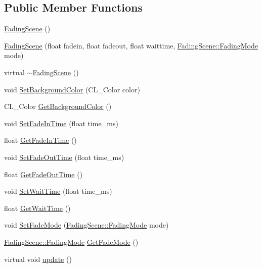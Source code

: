 \subsection*{Public Member Functions}
\begin{DoxyCompactItemize}
\item 
\hyperlink{class_fading_scene_ac2e17e101c77a8c3dace9bbea8d54f27}{FadingScene} ()
\item 
\hyperlink{class_fading_scene_a9ac1472cbd35acb25bce080e6279ca87}{FadingScene} (float fadein, float fadeout, float waittime, \hyperlink{class_fading_scene_aac44cee699d9da962cfd083422808805}{FadingScene::FadingMode} mode)
\item 
virtual \hyperlink{class_fading_scene_aad75b17457eccb13910230f77ff3cc71}{$\sim$FadingScene} ()
\item 
void \hyperlink{class_fading_scene_a9fc4f665d09a7d45867817d098f5ffd4}{SetBackgroundColor} (CL\_\-Color color)
\item 
CL\_\-Color \hyperlink{class_fading_scene_af79e9c4d787167ac2068db010843b647}{GetBackgroundColor} ()
\item 
void \hyperlink{class_fading_scene_a7442c6e14409bb3d19f9e7b2e5d90297}{SetFadeInTime} (float time\_\-ms)
\item 
float \hyperlink{class_fading_scene_ab14f983d9e1666684d6a7d41b2575519}{GetFadeInTime} ()
\item 
void \hyperlink{class_fading_scene_af5fc2ed76481ad4217914398b56f832a}{SetFadeOutTime} (float time\_\-ms)
\item 
float \hyperlink{class_fading_scene_ac0aa93b2522ece6052c518f3e17e1d44}{GetFadeOutTime} ()
\item 
void \hyperlink{class_fading_scene_a393089e50d6acebb9811f77e13996948}{SetWaitTime} (float time\_\-ms)
\item 
float \hyperlink{class_fading_scene_ad5359f9c482dc1e309ce3c28063ad2c0}{GetWaitTime} ()
\item 
void \hyperlink{class_fading_scene_af492fb8d42550f7e70c2f87abb6bdcaa}{SetFadeMode} (\hyperlink{class_fading_scene_aac44cee699d9da962cfd083422808805}{FadingScene::FadingMode} mode)
\item 
\hyperlink{class_fading_scene_aac44cee699d9da962cfd083422808805}{FadingScene::FadingMode} \hyperlink{class_fading_scene_a555c56c485e4cf2194d6f8797fb4db2d}{GetFadeMode} ()
\item 
virtual void \hyperlink{class_fading_scene_a87df73975854a1170eef8b5fadd63b92}{update} ()
\end{DoxyCompactItemize}
